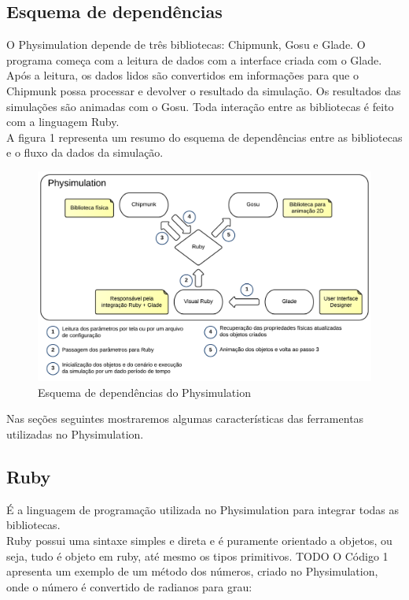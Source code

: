 \subsection{Esquema de dependências}
O Physimulation depende de três bibliotecas: Chipmunk, Gosu e Glade. O programa começa com a leitura de dados com a interface criada com o Glade. Após a leitura, 
os dados lidos são convertidos em informações para que o Chipmunk possa processar e devolver o resultado da simulação. Os resultados das simulações são animadas 
com o Gosu. Toda interação entre as bibliotecas é feito com a linguagem Ruby. \\

A figura 1 representa um resumo do esquema de dependências entre as bibliotecas e o fluxo da dados da simulação.

\begin{figure}[!htbp]
  \includegraphics[scale=0.2]{EsquemaDependencia.png}
  \caption{Esquema de dependências do Physimulation}
\end{figure}

Nas seções seguintes mostraremos algumas características das ferramentas utilizadas no Physimulation.

\subsection{Ruby}
É a linguagem de programação utilizada no Physimulation para integrar todas as bibliotecas.\\

Ruby possui uma sintaxe simples e direta e é puramente orientado a objetos, ou seja, tudo é objeto em ruby, até mesmo os tipos primitivos. TODO O Código 1 apresenta um exemplo de um método dos números, criado no Physimulation, onde o 
número é convertido de radianos para grau:

